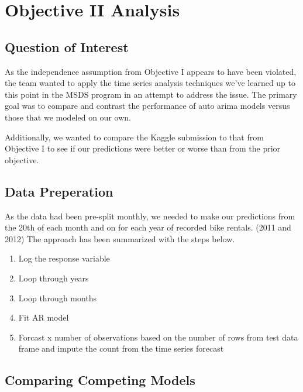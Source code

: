 \documentclass[american,]{article}
\begin{document}
\newpage

\hypertarget{objective-ii-analysis}{%
\section{Objective II Analysis}\label{objective-ii-analysis}}

\hypertarget{question-of-interest-1}{%
\subsection{Question of Interest}\label{question-of-interest-1}}

As the independence assumption from Objective I appears to have been violated, the team wanted to apply the time series analysis techniques we've learned up to this point in the MSDS program in an attempt to address the issue. The primary goal was to compare and contrast the performance of auto arima models versus those that we modeled on our own.

Additionally, we wanted to compare the Kaggle submission to that from Objective I to see if our predictions were better or worse than from the prior objective.

\hypertarget{data-preperation}{%
\subsection{Data Preperation}\label{data-preperation}}

As the data had been pre-split monthly, we needed to make our predictions from the 20th of each month and on for each year of recorded bike rentals. (2011 and 2012) The approach has been summarized with the steps below.

\begin{enumerate}
\def\labelenumi{\arabic{enumi}.}
\item
  Log the response variable
\item
  Loop through years
\item
  Loop through months
\item
  Fit AR model
\item
  Forcast x number of observations based on the number of rows from test data frame and impute the count from the time series forecast
\end{enumerate}

\newpage

\hypertarget{comparing-competing-models-1}{%
\subsection{Comparing Competing Models}\label{comparing-competing-models-1}}
\end{document}

